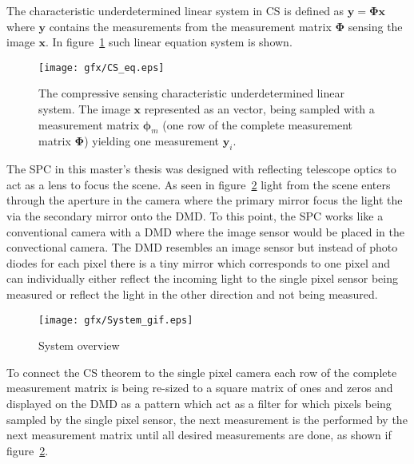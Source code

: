 The characteristic  underdetermined linear system in CS is defined as $ \mathbf{y} = \mathbf{\Phi}\mathbf{x}$ where $\mathbf{y}$ contains the measurements from the measurement matrix $\mathbf{\Phi}$ sensing the image $\mathbf{x}$. In figure~\ref{fig:CS_eq_sys} such linear equation system is shown.

\begin{figure}[H]
	\texttt{[image: gfx/CS\_eq.eps]}
	\caption{The compressive sensing characteristic underdetermined linear system. The image $\mathbf{x}$ represented as an vector, being sampled with a measurement matrix $\mathbf{\phi}_m$ (one row of the complete measurement matrix $\mathbf{\Phi}$) yielding one measurement $\mathbf{y}_i$.}
	\label{fig:CS_eq_sys}
\end{figure}

The SPC in this master's thesis was designed with reflecting telescope optics to act as a lens to focus the scene. As seen in figure~\ref{fig:system_overview} light from the scene enters through the aperture in the camera where the primary mirror focus the light the via the secondary mirror onto the DMD. To this point, the SPC works like a conventional camera with a DMD where the image sensor would be placed in the convectional camera. The DMD resembles an image sensor but instead of photo diodes for each pixel there is a tiny mirror which corresponds to one pixel and can individually either reflect the incoming light to the single pixel sensor being measured or reflect the light in the other direction and not being measured.




\begin{figure}[H]
\texttt{[image: gfx/System\_gif.eps]}
	\caption{System overview}
	\label{fig:system_overview}
\end{figure}	

To connect the CS theorem to the single pixel camera each row of the complete measurement matrix is being re-sized to a square matrix of ones and zeros and displayed on the DMD as a pattern which act as a filter for which pixels being sampled by the single pixel sensor, the next measurement is the performed by the next measurement matrix until all desired measurements are done, as shown if figure~\ref{fig:system_overview}.\\[0.1in]

